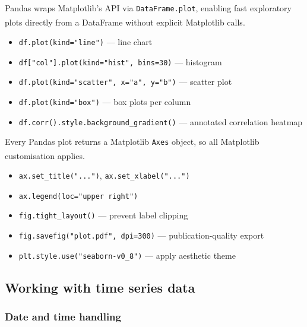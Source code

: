 \begin{tcbitemize}[ skin=sectionraster ]
    \tcbitem[title={Plotting with Pandas}, raster multicolumn=3]
    Pandas wraps Matplotlib's API via \texttt{DataFrame.plot}, enabling fast exploratory plots directly from a DataFrame without explicit Matplotlib calls\textsuperscript{\cite{molinHandsonDataAnalysis2021}}.
    \tcblower
    \begin{itemize}
        \item \texttt{df.plot(kind="line")} --- line chart
        \item \texttt{df["col"].plot(kind="hist", bins=30)} --- histogram
        \item \texttt{df.plot(kind="scatter", x="a", y="b")} --- scatter plot
        \item \texttt{df.plot(kind="box")} --- box plots per column
        \item \texttt{df.corr().style.background\_gradient()} --- annotated correlation heatmap
    \end{itemize}

    \tcbitem[title={Customizing Plots}, raster multicolumn=3]
    Every Pandas plot returns a Matplotlib \texttt{Axes} object, so all Matplotlib customisation applies\textsuperscript{\cite{molinHandsonDataAnalysis2021}}.
    \tcblower
    \begin{itemize}
        \item \texttt{ax.set\_title("...")}, \texttt{ax.set\_xlabel("...")}
        \item \texttt{ax.legend(loc="upper right")}
        \item \texttt{fig.tight\_layout()} --- prevent label clipping
        \item \texttt{fig.savefig("plot.pdf", dpi=300)} --- publication-quality export
        \item \texttt{plt.style.use("seaborn-v0\_8")} --- apply aesthetic theme
    \end{itemize}
\end{tcbitemize}

\subsection{Working with time series data}

\subsubsection{Date and time handling}

